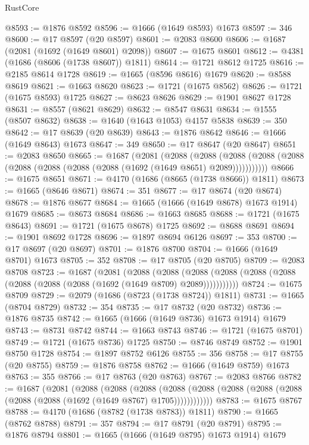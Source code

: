 \begin{lexlean}{RustCore}
\begin{coremodule}
@8593 := @1876 @8592
@8596 := @1666 (@1649 @8593) @1673
@8597 := 346
@8600 := @17 @8597 (@20 @8597)
@8601 := @2083 @8600
@8606 := @1687 (@2081 (@1692 (@1649 @8601) @2098))
@8607 := @1675 @8601
@8612 := @4381 (@1686 (@8606 (@1738 @8607)) @1811)
@8614 := @1721 @8612 @1725
@8616 := @2185 @8614 @1728
@8619 := @1665 (@8596 @8616) @1679
@8620 := @8588 @8619
@8621 := @1663 @8620
@8623 := @1721 (@1675 @8562)
@8626 := @1721 (@1675 @8593) @1725
@8627 := @8623 @8626
@8629 := @1901 @8627 @1728
@8631 := @8557 (@8621 @8629)
@8632 := @8547 @8631
@8634 := @1555 (@8507 @8632)
@8638 := @1640 (@1643 @1053) @4157 @5838
@8639 := 350
@8642 := @17 @8639 (@20 @8639)
@8643 := @1876 @8642
@8646 := @1666 (@1649 @8643) @1673
@8647 := 349
@8650 := @17 @8647 (@20 @8647)
@8651 := @2083 @8650
@8665 := @1687
    (@2081
      (@2088
        (@2088
          (@2088 (@2088 (@2088 (@2088 (@2088 (@2088 (@2088 (@1692 (@1649 @8651) @2089)))))))))))
@8666 := @1675 @8651
@8671 := @4170 (@1686 (@8665 (@1738 @8666)) @1811)
@8673 := @1665 (@8646 @8671)
@8674 := 351
@8677 := @17 @8674 (@20 @8674)
@8678 := @1876 @8677
@8684 := @1665 (@1666 (@1649 @8678) @1673 @1914) @1679
@8685 := @8673 @8684
@8686 := @1663 @8685
@8688 := @1721 (@1675 @8643)
@8691 := @1721 (@1675 @8678) @1725
@8692 := @8688 @8691
@8694 := @1901 @8692 @1728
@8696 := @1897 @8694 @6126
@8697 := 353
@8700 := @17 @8697 (@20 @8697)
@8701 := @1876 @8700
@8704 := @1666 (@1649 @8701) @1673
@8705 := 352
@8708 := @17 @8705 (@20 @8705)
@8709 := @2083 @8708
@8723 := @1687
    (@2081
      (@2088
        (@2088
          (@2088 (@2088 (@2088 (@2088 (@2088 (@2088 (@2088 (@1692 (@1649 @8709) @2089)))))))))))
@8724 := @1675 @8709
@8729 := @2079 (@1686 (@8723 (@1738 @8724)) @1811)
@8731 := @1665 (@8704 @8729)
@8732 := 354
@8735 := @17 @8732 (@20 @8732)
@8736 := @1876 @8735
@8742 := @1665 (@1666 (@1649 @8736) @1673 @1914) @1679
@8743 := @8731 @8742
@8744 := @1663 @8743
@8746 := @1721 (@1675 @8701)
@8749 := @1721 (@1675 @8736) @1725
@8750 := @8746 @8749
@8752 := @1901 @8750 @1728
@8754 := @1897 @8752 @6126
@8755 := 356
@8758 := @17 @8755 (@20 @8755)
@8759 := @1876 @8758
@8762 := @1666 (@1649 @8759) @1673
@8763 := 355
@8766 := @17 @8763 (@20 @8763)
@8767 := @2083 @8766
@8782 := @1687
    (@2081
      (@2088
        (@2088
          (@2088
            (@2088 (@2088 (@2088 (@2088 (@2088 (@2088 (@2088 (@1692 (@1649 @8767) @1705))))))))))))
@8783 := @1675 @8767
@8788 := @4170 (@1686 (@8782 (@1738 @8783)) @1811)
@8790 := @1665 (@8762 @8788)
@8791 := 357
@8794 := @17 @8791 (@20 @8791)
@8795 := @1876 @8794
@8801 := @1665 (@1666 (@1649 @8795) @1673 @1914) @1679

\end{coremodule}
\end{lexlean}
